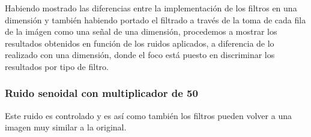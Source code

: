 Habiendo mostrado las diferencias entre la implementaci\'on de los filtros en
una dimensi\'on y tambi\'en habiendo portado el filtrado a trav\'es de la toma de cada
fila de la im\'agen como una se\~nal de una dimensi\'on, procedemos a mostrar
los resultados obtenidos en funci\'on de los ruidos aplicados, a diferencia de
lo realizado con una dimensi\'on, donde el foco est\'a puesto en discriminar los
resultados por tipo de filtro.

\subsubsection{Ruido senoidal con multiplicador de 50}

Este ruido es controlado y es as\'i como tambi\'en los filtros pueden volver a
una imagen muy similar a la original.


